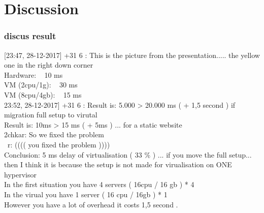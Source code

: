 \section{Discussion}
\paragraph{}










\subsubsection{discus result}

[23:47, 28-12-2017] +31 6 : This is the picture from the presentation..... the yellow one in the right down corner\\
Hardware: ~ 10 ms\\
VM (2cpu/1g): ~ 30 ms\\
VM (8cpu/4gb): ~ 15 ms\\
23:52, 28-12-2017] +31 6 : Result is: 5.000 > 20.000 ms ( + 1,5 second )  if migration full setup to virutal\\
Result is:  10ms > 15 ms ( + 5ms )   ... for a static website\\
2chkar: So we fixed the problem\\\
r: (((( you fixed the problem ))))\\
Conclusion:   5 ms delay of virtualisation ( 33 \% ) ... if you move the full setup... then %
I think it is because the setup is not made for virualisation on ONE hypervisor\\
In the first situation you have 4 servers ( 16cpu / 16 gb ) * 4\\
In the virual you have 1 server ( 16 cpu / 16gb ) * 1\\
However you have a lot of overhead it costs 1,5 second .\\